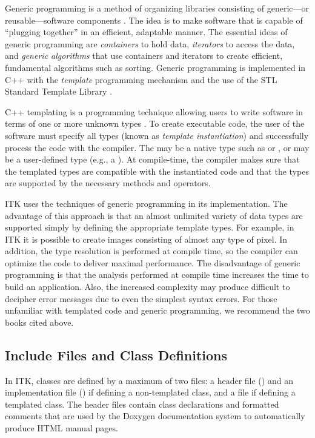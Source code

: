 Generic programming is a method of organizing libraries consisting of
generic---or reusable---software components \cite{Musser1996}. The idea is to
make software that is capable of ``plugging together'' in an efficient,
adaptable manner. The essential ideas of generic programming are
\emph{containers} to hold data, \emph{iterators} to access the data, and
\emph{generic algorithms} that use containers and iterators to create
efficient, fundamental algorithms such as sorting. Generic programming is
implemented in C++ with the \emph{template} programming mechanism and the
use of the STL Standard Template Library \cite{Austern1999}.

C++ templating is a programming technique allowing users to write software in
terms of one or more unknown types . To create executable code, the
user of the software must specify all types  (known as \emph{template
instantiation}) and successfully process the code with the compiler. The
 may be a native type such as
 or , or  may be a user-defined type (e.g.,
a ). At compile-time, the compiler makes sure that the templated
types are compatible with the instantiated code and that the types are
supported by the necessary methods and operators.

ITK uses the techniques of generic programming in its implementation. The
advantage of this approach is that an almost unlimited variety of data types
are supported simply by defining the appropriate template types. For example,
in ITK it is possible to create images consisting of almost any type of
pixel. In addition, the type resolution is performed at compile time, so the
compiler can optimize the code to deliver maximal performance. The
disadvantage of generic programming is that the analysis performed at compile
time increases the time to build an application. Also, the increased
complexity may produce difficult to decipher error messages due to even the
simplest syntax errors. For those unfamiliar with templated code and
generic programming, we recommend the two books cited above.

\subsection{Include Files and Class Definitions}
\label{sec:IncludeFiles}

In ITK, classes are defined by a maximum of two files: a header file ()
and an implementation file () if defining a non-templated class, and a
 file if defining a templated class.
The header files contain class declarations
and formatted comments that are used by the Doxygen documentation
system to automatically produce HTML manual pages.

